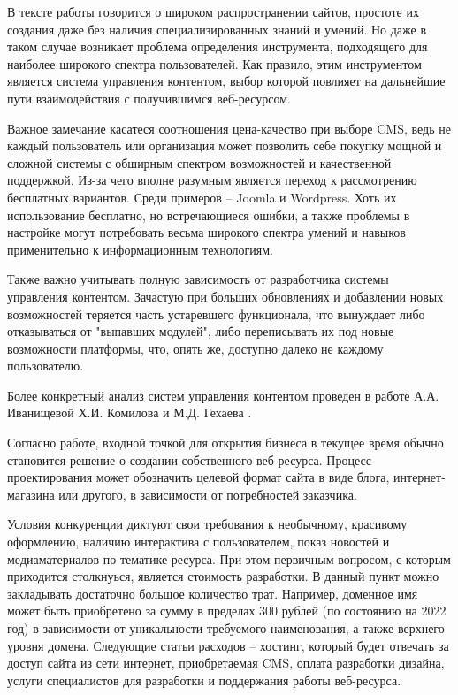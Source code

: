 В тексте работы говорится о широком распространении сайтов, простоте их создания даже без наличия специализированных знаний и умений.
Но даже в таком случае возникает проблема определения инструмента, подходящего для наиболее широкого спектра пользователей.
Как правило, этим инструментом является система управления контентом, выбор которой повлияет на дальнейшие пути взаимодействия с получившимся веб-ресурсом.

Важное замечание касатеся соотношения цена-качество при выборе CMS, ведь не каждый пользователь или организация может позволить себе покупку мощной и сложной системы с обширным спектром возможностей и качественной поддержкой.
Из-за чего вполне разумным является переход к рассмотрению бесплатных вариантов.
Среди примеров -- Joomla и Wordpress.
Хоть их использование бесплатно, но встречающиеся ошибки, а также проблемы в настройке могут потребовать весьма широкого спектра умений и навыков применительно к информационным технологиям.

Также важно учитывать полную зависимость от разработчика системы управления контентом.
Зачастую при больших обновлениях и добавлении новых возможностей теряется часть устаревшего функционала, что вынуждает либо отказываться от "выпавших модулей", либо переписывать их под новые возможности платформы, что, опять же, доступно далеко не каждому пользователю.

Более конкретный анализ систем управления контентом проведен в работе А.А. Иванищевой Х.И. Комилова и М.Д. Гехаева \cite{ivanisheva-cms}.

Согласно работе, входной точкой для открытия бизнеса в текущее время обычно становится решение о создании собственного веб-ресурса.
Процесс проектирования может обозначить целевой формат сайта в виде блога, интернет-магазина или другого, в зависимости от потребностей заказчика.

Условия конкуренции диктуют свои требования к необычному, красивому оформлению, наличию интерактива с пользователем, показ новостей и медиаматериалов по тематике ресурса.
При этом первичным вопросом, с которым приходится столкнуься, является стоимость разработки.
В данный пункт можно закладывать достаточно большое количество трат.
Например, доменное имя может быть приобретено за сумму в пределах 300 рублей (по состоянию на 2022 год) в зависимости от уникальности требуемого наименования, а также верхнего уровня домена.
Следующие статьи расходов -- хостинг, который будет отвечать за доступ сайта из сети интернет, приобретаемая CMS, оплата разработки дизайна, услуги специалистов для разработки и поддержания работы веб-ресурса.

